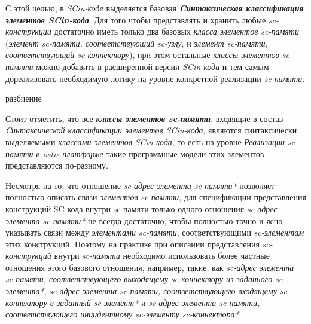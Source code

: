 С этой целью, в \textit{SCin-коде} выделяется базовая \textbf{\textit{Cинтаксическая классификация элементов SCin-кода}}. Для того чтобы представлять и хранить любые \textit{sc-конструкции} достаточно иметь только два базовых \textit{класса элементов sc-памяти} (\textit{элемент sc-памяти, соответствующий sc-узлу}, и \textit{элемент sc-памяти, соответствующий sc-коннектору}), при этом остальные \textit{классы элементов sc-памяти} можно добавить в расширенной версии \textit{SCin-кода} и тем самым дореализовать необходимую логику на уровне конкретной реализации \textit{sc-памяти}.

\begin{SCn}
\begin{scnsubstruct}

\begin{scnrelfromset}{разбиение}
    \begin{scnindent}
    \end{scnindent}
    \begin{scnindent}
    \end{scnindent}
    \begin{scnindent}
    \end{scnindent}
\end{scnrelfromset}

\end{scnsubstruct}
\end{SCn}

Стоит отметить, что все \textbf{\textit{классы элементов sc-памяти\scnsupergroupsign}}, входящие в состав \textit{Cинтаксической классификации элементов SCin-кода}, являются синтаксически выделяемыми \textit{классами элементов SCin-кода}, то есть на уровне \textit{Реализации sc-памяти в ostis-платформе} такие программные модели этих элементов представляются по-разному.

Несмотря на то, что отношение \textit{sc-адрес элемента sc-памяти*} позволяет полностью описать связи \textit{элементов sc-памяти}, для спецификации представления конструкций SC-кода внутри sc-памяти только одного отношения \textit{sc-адрес элемента sc-памяти*} не всегда достаточно, чтобы полностью точно и ясно указывать связи между \textit{элементами sc-памяти}, соответствующими \textit{sc-элементам} этих конструкций. Поэтому на практике при описании представления \textit{sc-конструкций} внутри \textit{sc-памяти} необходимо использовать более частные отношения этого базового отношения, например, такие, как \textit{sc-адрес элемента sc-памяти, соответствующего выходящему sc-коннектору из заданного sc-элемента*}, \textit{sc-адрес элемента sc-памяти, соответствующего входящему sc-коннектору в заданный sc-элемент*} и \textit{sc-адрес элемента sc-памяти, соответствующего инцидентному sc-элементу sc-коннектора*}.

